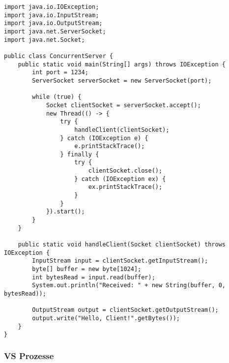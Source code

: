 \documentclass[../vs-script-first-v01.tex]{subfiles}
\begin{document}
\begin{lstlisting}[caption={Concurrent Server},captionpos=b,label={lst:concurrent}]
import java.io.IOException;
import java.io.InputStream;
import java.io.OutputStream;
import java.net.ServerSocket;
import java.net.Socket;

public class ConcurrentServer {
    public static void main(String[] args) throws IOException {
        int port = 1234;
        ServerSocket serverSocket = new ServerSocket(port);

        while (true) {
            Socket clientSocket = serverSocket.accept();
            new Thread(() -> {
                try {
                    handleClient(clientSocket);
                } catch (IOException e) {
                    e.printStackTrace();
                } finally {
                    try {
                        clientSocket.close();
                    } catch (IOException ex) {
                        ex.printStackTrace();
                    }
                }
            }).start();
        }
    }

    public static void handleClient(Socket clientSocket) throws IOException {
        InputStream input = clientSocket.getInputStream();
        byte[] buffer = new byte[1024];
        int bytesRead = input.read(buffer);
        System.out.println("Received: " + new String(buffer, 0, bytesRead));

        OutputStream output = clientSocket.getOutputStream();
        output.write("Hello, Client!".getBytes());
    }
}
\end{lstlisting}

\subsubsection{VS Prozesse}
\end{document}
